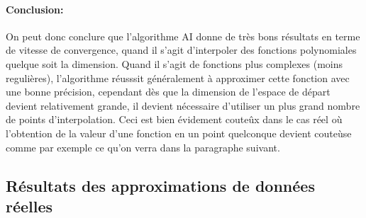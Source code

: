 \paragraph{Conclusion:\\}
\hspace{0.5cm} On peut donc conclure que l'algorithme AI donne de très bons résultats en terme de vitesse de convergence, quand il s'agit d'interpoler des fonctions polynomiales quelque soit la dimension.
Quand il s'agit de fonctions plus complexes (moins regulières), l'algorithme réusssit généralement à approximer cette fonction avec une bonne précision, cependant dès que la dimension de l'espace de départ devient relativement
grande, il devient nécessaire d'utiliser un plus grand nombre de points d'interpolation. Ceci est bien évidement couteûx dans le cas réel où l'obtention de la valeur d'une fonction en un point quelconque devient couteùse comme
par exemple ce qu'on verra dans la paragraphe suivant.
\newpage



\subsection{Résultats des approximations de données réelles}
